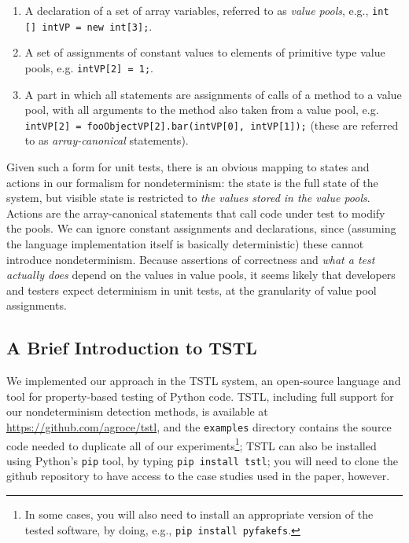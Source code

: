 \begin{enumerate}
\item A declaration of a set of array variables, referred to as
  \emph{value pools}, e.g., {\tt int [] intVP = new int[3];}.
  \item A set of assignments of constant values to elements of
    primitive type value pools, e.g. {\tt intVP[2] = 1;}.
    \item A part in which all statements are assignments of calls of a
      method to a value pool, with all arguments to the method also
      taken from a value pool, e.g. {\tt intVP[2] = fooObjectVP[2].bar(intVP[0],
        intVP[1]);} (these are referred to as \emph{array-canonical} statements).
    \end{enumerate}

Given such a form for unit tests, there is an obvious mapping to
states and actions in our formalism for nondeterminism:  the state is
the full state of the system, but visible state is restricted to
\emph{the values stored in the value pools}.  Actions are the
array-canonical statements that call code under test to modify the pools.  We can ignore constant assignments and
declarations, since (assuming the language implementation itself is
basically deterministic) these cannot introduce nondeterminism.
Because assertions of correctness and \emph{what a test actually does}
depend on the values in value pools, it seems likely that developers
and testers expect determinism in unit tests, at the granularity of
value pool assignments.

\subsection{A Brief Introduction to TSTL}
\label{sec:tstlintro}

We implemented our approach in the TSTL \cite{NFM15,ISSTA15,tstlsttt}
system, an open-source
language and tool for property-based testing
\cite{Hypothesis,ClaessenH00} of Python code.   TSTL, including full
support for our nondeterminism detection methods, is available at
\url{https://github.com/agroce/tstl}, and the {\tt examples} directory
contains the source code needed to duplicate all of our
experiments\footnote{In some cases, you will also need to install an
  appropriate version of the tested software, by doing, e.g., {\tt pip
    install pyfakefs}.};
TSTL can also be installed using Python's {\tt pip} tool, by typing
{\tt pip install tstl}; you will need to clone the github repository
to have access to the case studies used in the paper, however.

